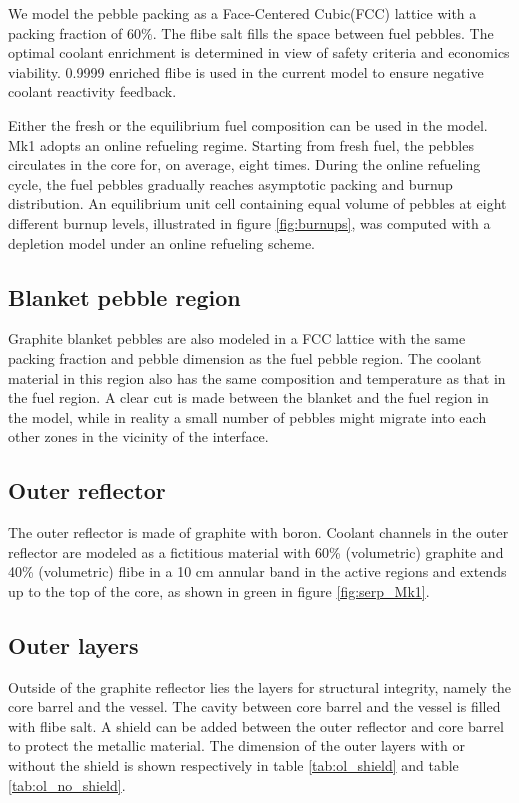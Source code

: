 \documentclass{elsarticle}
\begin{document}
We model the pebble packing as a Face-Centered Cubic(FCC) lattice with a packing fraction of 60\%. The flibe salt fills the space between fuel pebbles. The optimal coolant enrichment is determined in view of safety criteria and economics viability. 0.9999 enriched flibe is used in the current model to ensure negative coolant reactivity feedback. 

Either the fresh or the equilibrium fuel composition can be used in the model. Mk1 adopts an online refueling regime. Starting from fresh fuel, the pebbles circulates in the core for, on average, eight times. During the online refueling cycle, the fuel pebbles gradually reaches asymptotic packing and burnup distribution. An equilibrium unit cell containing equal volume of pebbles at eight different burnup levels, illustrated in figure \ref{fig:burnups}, was computed with a depletion model\cite{Cisneros2013} under an online refueling scheme. 




\subsection{Blanket pebble region}
Graphite blanket pebbles are also modeled in a FCC lattice with the same packing fraction and pebble dimension as the fuel pebble region. The coolant material in this region also has the same composition and temperature as that in the fuel region. A clear cut is made between the blanket and the fuel region in the model, while in reality a small number of pebbles might migrate into each other zones in the vicinity of the interface. 


\subsection{Outer reflector}
The outer reflector is made of graphite with boron. 
Coolant channels in the outer reflector are modeled as a fictitious material with 60\% (volumetric) graphite and 40\% (volumetric) flibe in a 10 cm annular band in the active regions and extends up to the top of the core, as shown in green in figure \ref{fig:serp_Mk1}.



\subsection{Outer layers}
Outside of the graphite reflector lies the layers for structural integrity, namely the core barrel and the vessel.
The cavity between core barrel and the vessel is filled with flibe salt. 
A shield can be added between the outer reflector and core barrel to protect the metallic material. 
The dimension of the outer layers with or without the shield is shown respectively in table \ref{tab:ol_shield} and table \ref{tab:ol_no_shield}. 
\end{document}

